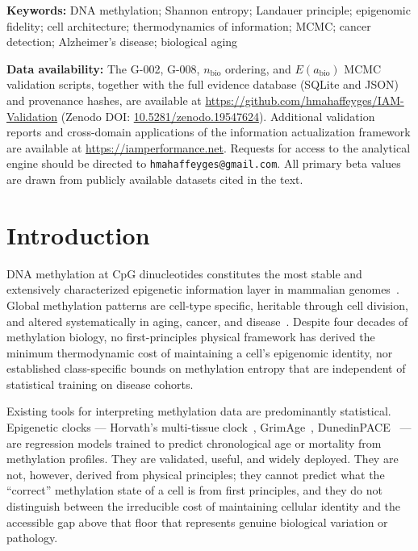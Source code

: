 \documentclass[12pt,a4paper]{article}
\begin{document}
\vspace{0.4cm}
\noindent\textbf{Keywords:} DNA methylation; Shannon entropy; Landauer principle;
epigenomic fidelity; cell architecture; thermodynamics of information; MCMC;
cancer detection; Alzheimer's disease; biological aging

\vspace{0.4cm}
{\small\noindent
\textbf{Data availability:} The G-002, G-008, $n_{\mathrm{bio}}$ ordering, and
$E(a_{\mathrm{bio}})$ MCMC validation scripts, together with the full evidence
database (SQLite and JSON) and provenance hashes, are available at
\url{https://github.com/hmahaffeyges/IAM-Validation}
(Zenodo DOI: \href{https://doi.org/10.5281/zenodo.19547624}{10.5281/zenodo.19547624}).
Additional validation reports and cross-domain applications of the information actualization
framework are available at \url{https://iamperformance.net}.
Requests for access to the analytical engine should be directed to \texttt{hmahaffeyges@gmail.com}.
All primary beta values are drawn from publicly available datasets cited in the text.}

\newpage
\tableofcontents
\newpage

\section{Introduction}
\label{sec:intro}

DNA methylation at CpG dinucleotides constitutes the most stable and
extensively characterized epigenetic information layer in mammalian
genomes~\cite{Bird2002,Jones2012}. Global methylation patterns are
cell-type specific, heritable through cell division, and altered systematically
in aging, cancer, and disease~\cite{Lister2009,Roadmap2015}. Despite four
decades of methylation biology, no first-principles physical framework has
derived the minimum thermodynamic cost of maintaining a cell's epigenomic
identity, nor established class-specific bounds on methylation entropy that
are independent of statistical training on disease cohorts.

Existing tools for interpreting methylation data are predominantly statistical.
Epigenetic clocks --- Horvath's multi-tissue clock~\cite{Horvath2013},
GrimAge~\cite{Lu2019}, DunedinPACE~\cite{Belsky2022} --- are regression
models trained to predict chronological age or mortality from methylation
profiles. They are validated, useful, and widely deployed. They are not,
however, derived from physical principles; they cannot predict what the
``correct'' methylation state of a cell is from first principles, and they
do not distinguish between the irreducible cost of maintaining cellular identity
and the accessible gap above that floor that represents genuine biological
variation or pathology.
\end{document}
